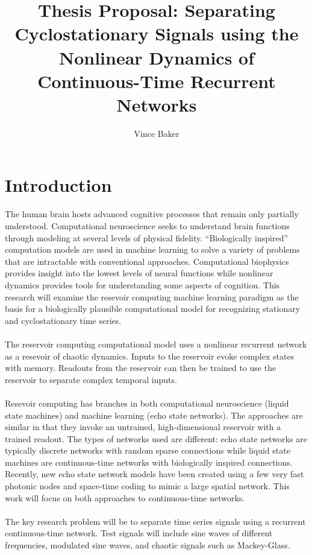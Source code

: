 \documentclass[a4paper,11pt]{article}
\title{Thesis Proposal: Separating Cyclostationary Signals using the Nonlinear Dynamics of Continuous-Time Recurrent Networks}
\author{Vince Baker}
\numberwithin{equation}{section}
\begin{document}
\maketitle

\section{Introduction} 
The human brain hosts advanced cognitive processes that remain only partially understood.
Computational neuroscience seeks to understand brain functions through modeling at several levels of physical fidelity.
``Biologically inspired'' computation models are used in machine learning to solve a variety of problems that are intractable with conventional approaches.
Computational biophysics provides insight into the lowest levels of neural functions while nonlinear dynamics provides tools for understanding some aspects of cognition.
This research will examine the resevoir computing machine learning paradigm as the basis for a biologically plausible computational model for recognizing stationary and cyclostationary time series.
\\ \\
The reservoir computing computational model uses a nonlinear recurrent network as a resevoir of chaotic dynamics.
Inputs to the reservoir evoke complex states with memory.
Readouts from the reservoir can then be trained to use the reservoir to separate complex temporal inputs.
\\ \\
Resevoir computing has branches in both computational neuroscience (liquid state machines) and machine learning (echo state networks).
The approaches are similar in that they invoke an untrained, high-dimensional reservoir with a trained readout.
The types of networks used are different: echo state networks are typically discrete networks with random sparse connections while liquid state machines are continuous-time networks with biologically inspired connections.
Recently, new echo state network models have been created using a few very fast photonic nodes and space-time coding to mimic a large spatial network.
This work will focus on both approaches to continuous-time networks.
\\ \\
The key research problem will be to separate time series signals using a recurrent continuous-time network. 
Test signals will include sine waves of different frequencies, modulated sine waves, and chaotic signals such as Mackey-Glass.
\end{document}
